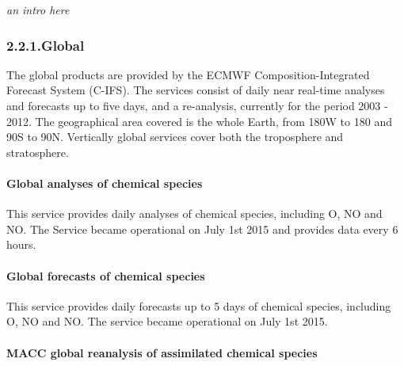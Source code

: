 \documentclass[9pt]{report}
\begin{document}
\noindent{}\emph{an intro here}%

\subsubsection{2.2.1.\hspace*{0.5em}Global}\label{sec-global}%

\noindent{}The global products are provided by the ECMWF Composition-Integrated Forecast System (C-IFS).
The services consist of daily near real-time analyses and forecasts up to five days, and a re-analysis, currently for the period 2003 - 2012. 
The geographical area covered is the whole Earth, from 180\textdegree{}W to 180\textdegree{} and 90\textdegree{}S to 90\textdegree{}N. 
Vertically global services cover both the troposphere and stratosphere.%

\paragraph{Global analyses of chemical species}\label{sec-global-analyses-of-chemical-species}%

\noindent{}\mdbr
{}This service provides daily analyses of chemical species, including O, NO and NO. 
The Service became operational on July 1st 2015 and provides data every 6 hours.%

\paragraph{Global forecasts of chemical species}\label{sec-global-forecasts-of-chemical-species}%

\noindent{}\mdbr
{}This service provides daily forecasts up to 5 days of chemical species, including O, NO and NO. 
The service became operational on July 1st 2015.%

\paragraph{MACC global reanalysis of assimilated chemical species}\label{sec-macc-global-reanalysis-of-assimilated-chemical-species}%
\end{document}
